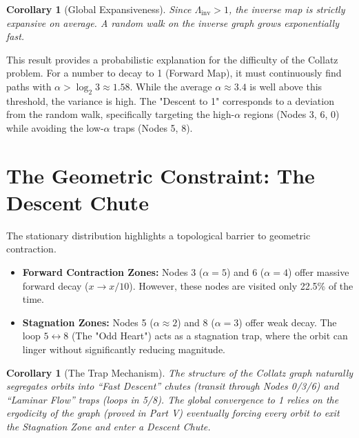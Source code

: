 \documentclass[11pt,letterpaper]{amsart}
\theoremstyle{definition}
\theoremstyle{plain}
\theoremstyle{plain}
\newtheorem{corollary}[theorem]{Corollary}
\theoremstyle{remark}
\begin{document}
\begin{corollary}[Global Expansiveness]
Since $\Lambda_{\text{inv}} > 1$, the inverse map is strictly expansive on average. A random walk on the inverse graph grows exponentially fast.
\end{corollary}

This result provides a probabilistic explanation for the difficulty of the Collatz problem. For a number to decay to 1 (Forward Map), it must continuously find paths with $\alpha > \log_2 3 \approx 1.58$. While the average $\alpha \approx 3.4$ is well above this threshold, the variance is high. The "Descent to 1" corresponds to a deviation from the random walk, specifically targeting the high-$\alpha$ regions (Nodes 3, 6, 0) while avoiding the low-$\alpha$ traps (Nodes 5, 8).

\section{The Geometric Constraint: The Descent Chute}

The stationary distribution highlights a topological barrier to geometric contraction.
\begin{itemize}
    \item \textbf{Forward Contraction Zones:} Nodes 3 ($\alpha=5$) and 6 ($\alpha=4$) offer massive forward decay ($x \to x/10$). However, these nodes are visited only 22.5\% of the time.
    \item \textbf{Stagnation Zones:} Nodes 5 ($\alpha \approx 2$) and 8 ($\alpha=3$) offer weak decay. The loop $5 \leftrightarrow 8$ (The "Odd Heart") acts as a stagnation trap, where the orbit can linger without significantly reducing magnitude.
\end{itemize}

\begin{corollary}[The Trap Mechanism]
The structure of the Collatz graph naturally segregates orbits into ``Fast Descent'' chutes (transit through Nodes 0/3/6) and ``Laminar Flow'' traps (loops in 5/8). The global convergence to 1 relies on the ergodicity of the graph (proved in Part V) eventually forcing every orbit to exit the Stagnation Zone and enter a Descent Chute.
\end{corollary}



\end{document}
